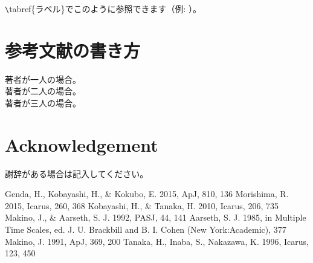 \documentclass[a4paper,10pt,oneside,twocolumn,notitlepage,final]{jarticle}
\begin{document}
\verb+\+tabref\{ラベル\}でこのように参照できます（例: ）。

\section{参考文献の書き方}
\noindent
著者が一人の場合\citep{ラベル1}。\\
著者が二人の場合\citep{ラベル2}。\\
著者が三人の場合\citep{ラベル3}。\\
\section*{Acknowledgement}
謝辞がある場合は記入してください。

\small
\begin{thebibliography}{99}
 Genda, H., Kobayashi, H., \& Kokubo, E. 2015, ApJ, 810, 136
 Morishima, R. 2015, Icarus, 260, 368
 Kobayashi, H., \& Tanaka, H. 2010, Icarus, 206, 735
 Makino, J., \& Aarseth, S. J. 1992, PASJ, 44, 141
 Aarseth, S. J. 1985, in Multiple Time Scales, ed. J. U. Brackbill and B. I. Cohen (New York:Academic), 377
 Makino, J. 1991, ApJ, 369, 200
 Tanaka, H., Inaba, S., Nakazawa, K. 1996, Icarus, 123, 450
\end{thebibliography}
\end{document}
